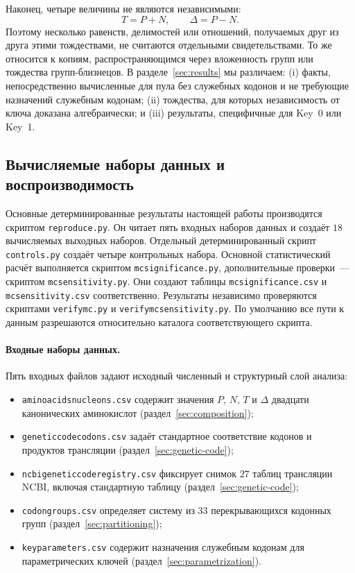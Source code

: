 \documentclass[11pt,a4paper]{article}
\renewcommand{\_}{\origunderscore\allowbreak}
\begin{document}
Наконец, четыре величины не являются независимыми:
\[
T=P+N,
\qquad
\Delta=P-N.
\]
Поэтому несколько равенств, делимостей или отношений, получаемых друг
из друга этими тождествами, не считаются отдельными свидетельствами.
То же относится к копиям, распространяющимся через вложенность групп
или тождества групп-близнецов. В разделе~\ref{sec:results} мы
различаем: (i) факты, непосредственно вычисленные для пула без
служебных кодонов и не требующие назначений служебным кодонам;
(ii) тождества,
для которых независимость от ключа доказана алгебраически; и
(iii) результаты, специфичные для Key~0 или Key~1.

\subsection{Вычисляемые наборы данных и воспроизводимость}
\label{sec:datasets}

\begingroup\sloppy

Основные детерминированные результаты настоящей работы производятся
скриптом \texttt{reproduce.py}. Он читает пять входных наборов данных
и создаёт $18$ вычисляемых выходных наборов. Отдельный
детерминированный скрипт \texttt{controls.py} создаёт четыре
контрольных набора. Основной статистический расчёт выполняется
скриптом \texttt{mc\_significance.py}, дополнительные проверки~---
скриптом \texttt{mc\_sensitivity.py}. Они создают таблицы
\texttt{mc\_significance.csv} и \texttt{mc\_sensitivity.csv}
соответственно. Результаты независимо проверяются скриптами
\texttt{verify\_mc.py} и \texttt{verify\_mc\_sensitivity.py}.
По умолчанию все пути к данным разрешаются относительно каталога
соответствующего скрипта.

\paragraph{Входные наборы данных.}
Пять входных файлов задают исходный численный и структурный слой
анализа:
\begin{itemize}
  \item \texttt{amino\_acids\_nucleons.csv} содержит значения
        $P$, $N$, $T$ и $\Delta$ двадцати канонических аминокислот
        (раздел~\ref{sec:composition});
  \item \texttt{genetic\_code\_codons.csv} задаёт стандартное
        соответствие кодонов и продуктов трансляции
        (раздел~\ref{sec:genetic-code});
  \item \texttt{ncbi\_genetic\_code\_registry.csv} фиксирует снимок
        $27$ таблиц трансляции NCBI, включая стандартную таблицу
        (раздел~\ref{sec:genetic-code});
  \item \texttt{codon\_groups.csv} определяет систему из $33$
        перекрывающихся кодонных групп
        (раздел~\ref{sec:partitioning});
  \item \texttt{key\_parameters.csv} содержит назначения служебным
        кодонам для параметрических ключей
        (раздел~\ref{sec:parametrization}).
\end{itemize}
\end{document}
